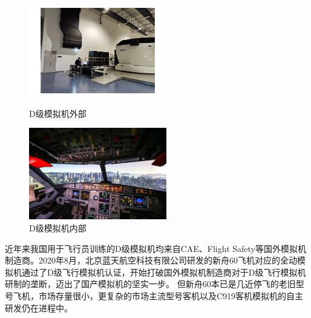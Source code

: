 \begin{figure}[h!]
    \begin{minipage}[t]{0.48\textwidth}
        \centering
        \includegraphics[width=6cm]{pictures/simulator.png}
        \caption{D级模拟机外部}
        \label{simout}
    \end{minipage}
    \begin{minipage}[t]{0.48\textwidth}
        \centering
        \includegraphics[width=6cm]{pictures/simulator.jpg}
        \caption{D级模拟机内部}
        \label{siminn}
    \end{minipage}
\end{figure}
\par
近年来我国用于飞行员训练的D级模拟机均来自CAE、Flight Safety等国外模拟机制造商。2020年8月，北京蓝天航空科技有限公司研发的新舟60飞机对应的全动模拟机通过了D级飞行模拟机认证，开始打破国外模拟机制造商对于D级飞行模拟机研制的垄断，迈出了国产模拟机的坚实一步\cite{simhis3}。
但新舟60本已是几近停飞的老旧型号飞机，市场存量很小，更复杂的市场主流型号客机以及C919客机模拟机的自主研发仍在进程中。
